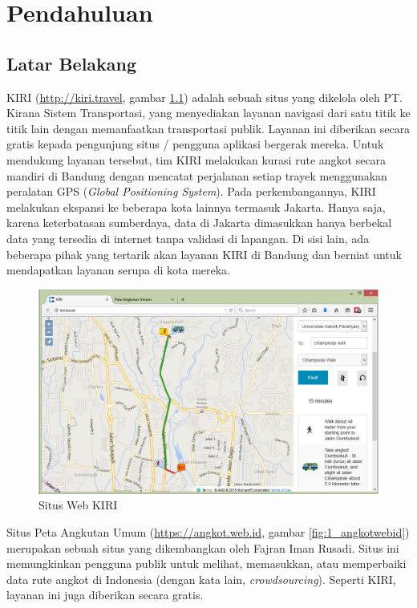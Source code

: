 \chapter{Pendahuluan}

\section{Latar Belakang}

KIRI (\url{http://kiri.travel}, gambar \ref{fig:1_kiri}) adalah sebuah situs yang dikelola oleh PT. Kirana Sistem Transportasi, yang menyediakan layanan navigasi dari satu titik ke titik lain dengan memanfaatkan transportasi publik. Layanan ini diberikan secara gratis kepada pengunjung situs / pengguna aplikasi bergerak mereka. Untuk mendukung layanan tersebut, tim KIRI melakukan kurasi rute angkot secara mandiri di Bandung dengan mencatat perjalanan setiap trayek menggunakan peralatan GPS (\textit{Global Positioning System}). Pada perkembangannya, KIRI melakukan ekspansi ke beberapa kota lainnya termasuk Jakarta. Hanya saja, karena keterbatasan sumberdaya, data di Jakarta dimasukkan hanya berbekal data yang tersedia di internet tanpa validasi di lapangan. Di sisi lain, ada beberapa pihak yang tertarik akan layanan KIRI di Bandung dan berniat untuk mendapatkan layanan serupa di kota mereka.

\begin{figure}
	\centering
	\includegraphics[scale=0.5]{Gambar/1_kiri}
	\caption{Situs Web KIRI} 
	\label{fig:1_kiri}
\end{figure}

Situs Peta Angkutan Umum (\url{https://angkot.web.id}, gambar \ref{fig:1_angkotwebid}) merupakan sebuah situs yang dikembangkan oleh Fajran Iman Rusadi. Situs ini memungkinkan pengguna publik untuk melihat, memasukkan, atau memperbaiki data rute angkot di Indonesia (dengan kata lain, \textit{crowdsourcing}). Seperti KIRI, layanan ini juga diberikan secara gratis.

